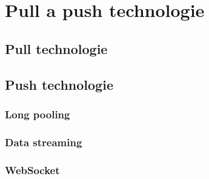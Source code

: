 
\section{Pull a push technologie}
\subsection{Pull technologie}
\subsection{Push technologie}
\subsubsection{Long pooling}
\subsubsection{Data streaming}
\subsubsection{WebSocket}